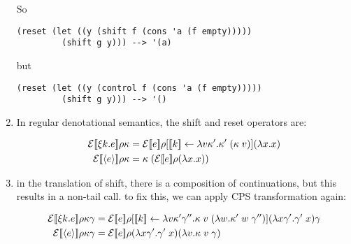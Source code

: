 \documentclass[letterpaper]{llncs}
\begin{document}
\begin{enumerate}
So
\begin{verbatim}
(reset (let ((y (shift f (cons 'a (f empty)))))
         (shift g y))) --> '(a)
\end{verbatim}
 but
\begin{verbatim}
(reset (let ((y (control f (cons 'a (f empty)))))
         (shift g y))) --> '()
\end{verbatim}

\item In regular denotational semantics, the shift and reset operators are:

\begin{align*}
\evaldefault{\shift{k}{e}} &= 
\eval{e}{\rho[\deno{k} \leftarrow 
              \lam{v\kappa'}
                  {\app{\kappa'}
                       {\appp{\kappa}{v}}}]}
        {\idcont} \\
\evaldefault{\reset{e}} &=
\app{ \kappa }
    { (\eval{e}{\rho}{\idcont}) }
\end{align*}

	\item in the translation of shift, there is a composition of continuations, but this results in a non-tail call. to fix this, we can apply CPS transformation again:
	
\begin{align*}
\evaltwodefault{\shift{k}{e}} &= 
\evaltwo{e}
        {\rho[\deno{k} \leftarrow 
              \lam{v\kappa'\gamma''}
                  {\apptwo{\kappa}
                          {v}
                          {\lamp{w}{\apptwo{\kappa'}{w}{\gamma''}}}}]}
        {\idconttwo}{\gamma} \\
\evaltwodefault{\reset{e}} &=
\evaltwo{e}{\rho}{\idconttwo}{\lamp{v}{\apptwo{\kappa}{v}{\gamma}}}
\end{align*}

 
\end{enumerate}







\end{document}
